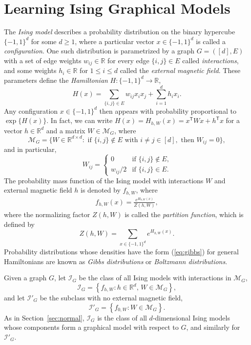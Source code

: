 \documentclass[letterpaper]{amsart}
\newcommand{\sI}{\mathcal{I}}
\newcommand{\sM}{\mathcal{M}}
\newcommand{\R}{\mathbb{R}}
\let\originalleft\left
\let\originalright\right
\def\left#1{\mathopen{}\originalleft#1}
\def\right#1{\originalright#1\mathclose{}}
\newcommand{\seclabel}[1]{\label{sec:#1}}
\newcommand{\secref}[1]{\mbox{Section~\ref{sec:#1}}}
\newcommand{\eqlabel}[1]{\label{eq:#1}}
\renewcommand{\eqref}[1]{(\ref{eq:#1})}
\numberwithin{thm}{section}
\theoremstyle{definition}
\theoremstyle{plain}
\newcommand{\transpose}{^{\mathsf{T}}}
\begin{document}
\section{Learning Ising Graphical Models}\seclabel{ising}
The \emph{Ising model} describes a probability distribution on the
binary hypercube $\{-1, 1\}^d$ for some $d \ge 1$, where a particular
vector $x \in \{-1, 1\}^d$ is called a \emph{configuration}.  One such
distribution is parametrized by a graph $G = ([d], E)$ with a set of
edge weights $w_{ij} \in \R$ for every edge $\{i, j\} \in E$ called
\emph{interactions}, and some weights $h_i \in \R$ for $1 \le i \le d$
called the \emph{external magnetic field}. These parameters define the
\emph{Hamiltonian} $H \colon \{-1, 1\}^d \to \R$,
\[
  H(x) = \sum_{\{i, j\} \in E} w_{ij} x_i x_j + \sum_{i = 1}^d h_i x_i.
\]
Any configuration $x \in \{-1, 1\}^d$ then appears with probability
proportional to $\exp\{H(x)\}$. In fact, we can write
$H(x) = H_{h, W}(x) = x\transpose W x + h\transpose x$ for a vector
$h \in \R^d$ and a matrix $W \in \sM_G$, where
\[
  \sM_G = \Big\{W \in \R^{d \times d} \colon \text{ if } \{i, j\} \not\in E \text{ with } i \neq j \in [d], \text{ then } W_{ij} = 0 \Big\} ,
\]
and in particular,
\[
  W_{ij} = \left\{ \begin{array}{ll}
                     0 & \mbox{if $\{i, j\} \not\in E$,} \\
                     w_{ij}/2 & \mbox{if $\{i, j\} \in E$.}
                   \end{array} \right.
\]
The probability mass function of the Ising model with interactions $W$
and external magnetic field $h$ is denoted by $f_{h, W}$, where
\begin{align}
  f_{h, W}(x) = \frac{e^{H_{h, W}(x)}}{Z(h, W)} , \eqlabel{gibbs}
\end{align}
where the normalizing factor $Z(h, W)$ is called the \emph{partition
  function}, which is defined by
\[
  Z(h, W) = \sum_{x \in \{-1, 1\}^d} e^{H_{h, W}(x)} .
\]
Probability distributions whose densities have the form \eqref{gibbs}
for general Hamiltonians are known as \emph{Gibbs distributions} or
\emph{Boltzmann distributions}.

Given a graph $G$, let $\sI_G$ be the class of all Ising
models with interactions in $\sM_G$,
\[
  \sI_G = \left\{ f_{h, W} \colon h\in \R^d, \, W \in \sM_G \right\} ,
\]
and let $\sI'_G$ be the subclass with no external magnetic field,
\[
  \sI'_G = \left\{ f_{0, W} \colon W \in \sM_G \right\} .
\]
As in \secref{normal}, $\sI_G$ is the class of all $d$-dimensional
Ising models whose components form a graphical model with respect to
$G$, and similarly for $\sI'_G$.
\end{document}
